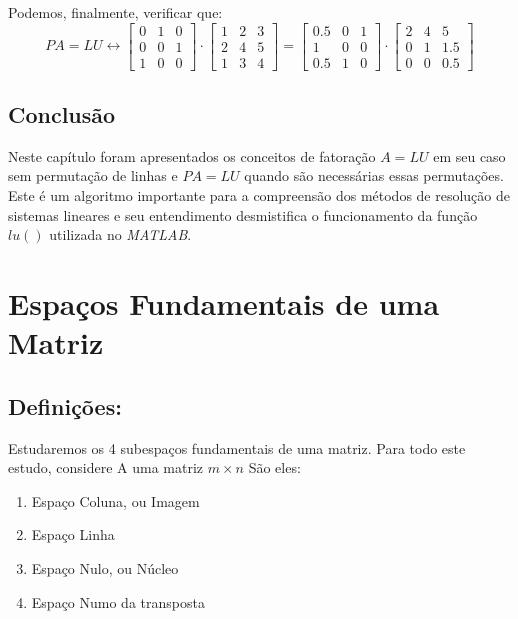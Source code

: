 \documentclass[12pt]{article}
\begin{document}
	Podemos, finalmente, verificar que:
	\begin{equation*}
		PA=LU \leftrightarrow 
		\begin{bmatrix}
			0 & 1 & 0\\
			0 & 0 & 1\\
			1 & 0 & 0
		\end{bmatrix}
		\cdot  
		\begin{bmatrix}
			1 & 2 & 3\\
			2 & 4 & 5\\
			1 & 3 & 4
		\end{bmatrix}=
		\begin{bmatrix}
			0.5 & 0 & 1\\
			1 & 0 & 0\\
			0.5 & 1 & 0
		\end{bmatrix} \cdot
		\begin{bmatrix}
			2 & 4 & 5\\
			0 & 1 & 1.5\\
			0 & 0 & 0.5
		\end{bmatrix}
	\end{equation*}
	
	\subsection{Conclusão}
	Neste capítulo foram apresentados os conceitos de fatoração $A=LU$ em seu caso sem permutação de linhas e $PA=LU$ quando são necessárias essas permutações. Este é um algoritmo importante para a compreensão dos métodos de resolução de sistemas lineares e seu entendimento desmistifica o funcionamento da função $lu()$ utilizada no \textit{MATLAB}.
	
	\section{Espaços Fundamentais de uma Matriz}
	\subsection{Definições:}
	
	Estudaremos os 4 subespaços fundamentais de uma matriz. Para todo este estudo, considere A uma matriz $m\times n$ São eles:
	\begin{enumerate}
		\item Espaço Coluna, ou Imagem
		\item Espaço Linha
		\item Espaço Nulo, ou Núcleo
		\item Espaço Numo da transposta
	\end{enumerate}
	
\end{document}
